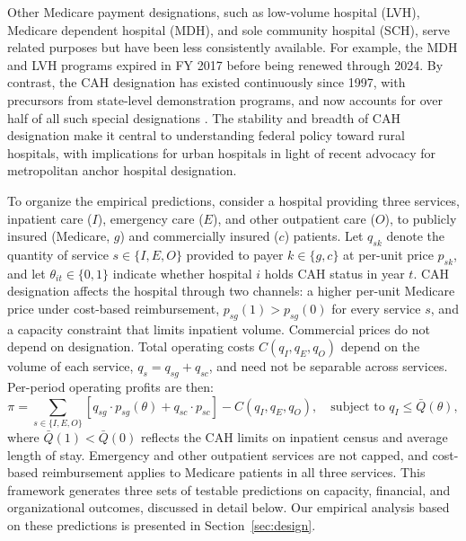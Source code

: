 \documentclass[a4paper, 12pt, twoside]{article}
\begin{document}
Other Medicare payment designations, such as low-volume hospital (LVH), Medicare dependent hospital (MDH), and sole community hospital (SCH), serve related purposes but have been less consistently available. For example, the MDH and LVH programs expired in FY 2017 before being renewed through 2024. By contrast, the CAH designation has existed continuously since 1997, with precursors from state-level demonstration programs, and now accounts for over half of all such special designations \citep{crs2023}. The stability and breadth of CAH designation make it central to understanding federal policy toward rural hospitals, with implications for urban hospitals in light of recent advocacy for metropolitan anchor hospital designation.

To organize the empirical predictions, consider a hospital providing three services, inpatient care ($I$), emergency care ($E$), and other outpatient care ($O$), to publicly insured (Medicare, $g$) and commercially insured ($c$) patients. Let $q_{sk}$ denote the quantity of service $s \in \{I, E, O\}$ provided to payer $k \in \{g, c\}$ at per-unit price $p_{sk}$, and let $\theta_{it} \in \{0,1\}$ indicate whether hospital $i$ holds CAH status in year $t$. CAH designation affects the hospital through two channels: a higher per-unit Medicare price under cost-based reimbursement, $p_{sg}(1) > p_{sg}(0)$ for every service $s$, and a capacity constraint that limits inpatient volume. Commercial prices do not depend on designation. Total operating costs $C(q_I, q_E, q_O)$ depend on the volume of each service, $q_s = q_{sg} + q_{sc}$, and need not be separable across services. Per-period operating profits are then:
\begin{equation}
\pi = \sum_{s \in \{I,E,O\}} \left[ q_{sg} \cdot p_{sg}(\theta) + q_{sc} \cdot p_{sc} \right] - C(q_I, q_E, q_O), \quad \text{subject to } q_I \leq \bar{Q}(\theta),
\label{eq:cah_profit}
\end{equation}
where $\bar{Q}(1) < \bar{Q}(0)$ reflects the CAH limits on inpatient census and average length of stay. Emergency and other outpatient services are not capped, and cost-based reimbursement applies to Medicare patients in all three services. This framework generates three sets of testable predictions on capacity, financial, and organizational outcomes, discussed in detail below. Our empirical analysis based on these predictions is presented in Section~\ref{sec:design}.
\end{document}
